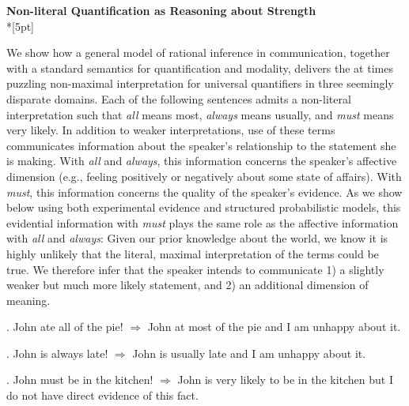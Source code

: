 \documentclass[12pt]{article}
\begin{document}
\begin{center}\textbf{Non-literal Quantification as Reasoning about Strength}\\*[5pt]
\end{center}

\vspace{-11pt}


We show how a general model of rational inference in communication, together with a standard semantics for quantification and modality, delivers the at times puzzling non-maximal interpretation for universal quantifiers in three seemingly disparate domains. Each of the following sentences admits a non-literal interpretation such that \emph{all} means most, \emph{always} means usually, and \emph{must} means very likely. In addition to weaker interpretations, use of these terms communicates information about the speaker's relationship to the statement she is making. With \emph{all} and \emph{always}, this information concerns the speaker's affective dimension (e.g., feeling positively or negatively about some state of affairs). With \emph{must}, this information concerns the quality of the speaker's evidence. As we show below using both experimental evidence and structured probabilistic models, this evidential information with \emph{must} plays the same role as the affective information with \emph{all} and \emph{always}: Given our prior knowledge about the world, we know it is highly unlikely that the literal, maximal interpretation of the terms could be true. We therefore infer that the speaker intends to communicate 1) a slightly weaker but much more likely statement, and 2) an additional dimension of meaning. 

\ex. John ate all of the pie! $\Rightarrow$ John at most of the pie and I am unhappy about it.

\ex. John is always late! $\Rightarrow$ John is usually late and I am unhappy about it.

\ex. John must be in the kitchen! $\Rightarrow$ John is very likely to be in the kitchen but I do not have direct evidence of this fact.

\end{document}
